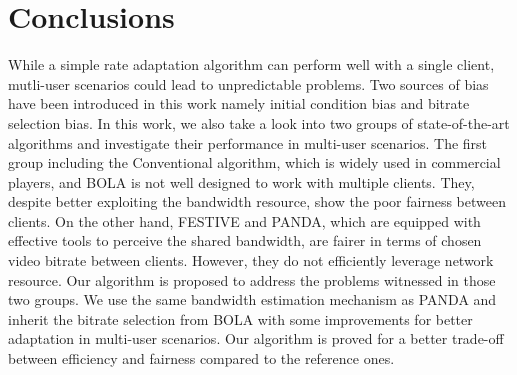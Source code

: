 \documentclass[journal]{IEEEtran}
\begin{document}
\section{Conclusions}
While a simple rate adaptation algorithm can perform well with a single client, mutli-user scenarios could lead to unpredictable problems. Two sources of bias have been introduced in this work namely initial condition bias and bitrate selection bias. In this work, we also take a look into two groups of state-of-the-art algorithms and investigate their performance in multi-user scenarios. The first group including the Conventional algorithm, which is widely used in commercial players, and BOLA is not well designed to work with multiple clients. They, despite better exploiting the bandwidth resource, show the poor fairness between clients. On the other hand, FESTIVE and PANDA, which are equipped with effective tools to perceive the shared bandwidth, are fairer in terms of chosen video bitrate between clients. However, they do not efficiently leverage network resource. Our algorithm is proposed to address the problems witnessed in those two groups. We use the same bandwidth estimation mechanism as PANDA and inherit the bitrate selection from BOLA with some improvements for better adaptation in multi-user scenarios. Our algorithm is proved for a better trade-off between efficiency and fairness compared to the reference ones.
%
%

\end{document}
